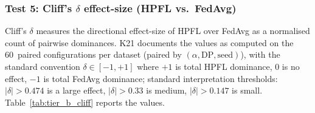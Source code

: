 \documentclass[conference]{IEEEtran}
\begin{document}
\begin{table}[htbp]
\centering
\caption{Bootstrap 95\% CI for the best HPFL configuration per dataset. $n{=}5$ seeds, 10{,}000~resamples. The CI is tight on PTB-XL and Diabetes 130-H ($\pm 1$pp), wider on Cardiovascular ($\pm 5$pp) due to the 5.3\% per-seed std at the optimal cell.}
\label{tab:tier_b_bootstrap}
\small
{}
\end{table}

\subsubsection*{Test 5: Cliff's $\delta$ effect-size (HPFL vs.\ FedAvg)}

Cliff's $\delta$ measures the directional effect-size of HPFL over FedAvg as a normalised count of pairwise dominances. K21 documents the values as computed on the 60~paired configurations per dataset (paired by $(\alpha,\text{DP},\text{seed})$), with the standard convention $\delta\in[-1,+1]$ where $+1$ is total HPFL dominance, $0$ is no effect, $-1$ is total FedAvg dominance; standard interpretation thresholds: $|\delta|>0.474$ is a large effect, $|\delta|>0.33$ is medium, $|\delta|>0.147$ is small. Table~\ref{tab:tier_b_cliff} reports the values.
\end{document}
